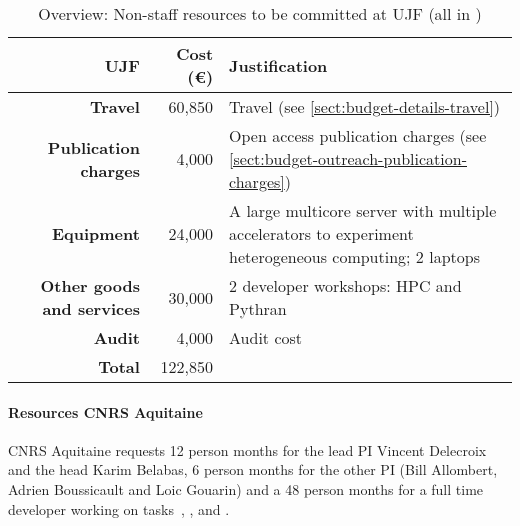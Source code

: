 \bigskip
\begin{table}[H]
\begin{tabular}{|r|r|p{8.5cm}|}
\hline
\textbf{UJF} & \textbf{Cost (\euro)} & \textbf{Justification} \\\hline
\textbf{Travel} & 60,850 & Travel (see \ref{sect:budget-details-travel})\\\hline
\textbf{Publication charges} & 4,000 & Open access publication charges (see \ref{sect:budget-outreach-publication-charges})\\\hline
\textbf{Equipment} & 24,000 &A large multicore server with
multiple accelerators to experiment heterogeneous computing; 2 laptops  \\\hline     %

\textbf{Other goods and services} & 30,000 & 2 developer workshops: HPC and Pythran \\\hline   %
\textbf{Audit} & 4,000 & Audit cost \\\hline
\textbf{Total} & 122,850\\\cline{1-2}
\end{tabular}
\caption{Overview: Non-staff resources to be committed at UJF (all in \texteuro)}\vspace*{-1em}
\end{table}




\paragraph{Resources CNRS Aquitaine}

CNRS Aquitaine requests 12 person months for the lead PI Vincent Delecroix and
the \PariGP head Karim Belabas, 6 person months for the other PI
(Bill Allombert, Adrien Boussicault and Loic Gouarin) and
a 48 person months for a full time developer working on tasks~,
,  and .

